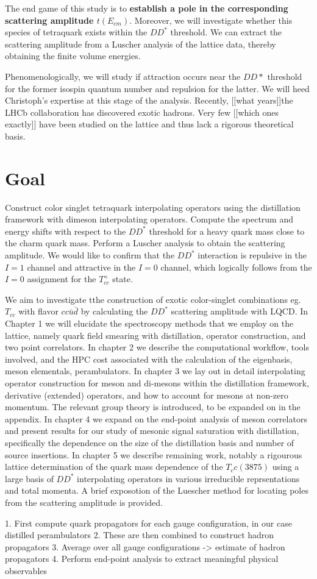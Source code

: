 The end game of this study is to \textbf{establish a pole in the corresponding scattering amplitude $t(E_{cm})$}. Moreover, we will investigate whether this species of tetraquark exists within the $DD^*$ threshold. We can extract the scattering amplitude from a Luscher analysis of the lattice data, thereby obtaining the finite volume energies. 

Phenomenologically, we will study if attraction occurs near the $DD*$ threshold for the former isospin quantum number and repulsion for the latter. We will heed  Christoph's expertise at this stage of the analysis. Recently, [[what years]]the LHCb collaboration has discovered exotic hadrons. Very few [[which ones exactly]] have been studied on the lattice and thus lack a rigorous theoretical basis.
\section{Goal}
Construct color singlet tetraquark interpolating operators using the distillation framework with dimeson interpolating operators. Compute the spectrum and energy shifts with respect to the $DD^*$ threshold for a heavy quark mass close to the charm quark mass. Perform a Luscher analysis to obtain the scattering amplitude. We would like to confirm that the $DD^*$ interaction is repulsive in the $I=1$ channel and attractive in the $I=0$ channel, which logically follows from the $I=0$ assignment for the $T_{cc}^+$ state. 

We aim to investigate tthe construction of exotic color-singlet combinations eg. $T_{cc}$ with flavor $cc\bar{u}\bar{d}$ by calculating the $DD^*$ scattering amplitude with LQCD. In Chapter 1 we will elucidate the spectroscopy methods that we employ on the lattice, namely quark field smearing with distillation, operator construction, and two point correlators. In chapter 2 we describe the computational workflow, tools involved, and the HPC cost associated with the calculation of the eigenbasis, meson elementals, perambulators. In chapter 3 we lay out in detail interpolating operator construction for meson and di-mesons within the distillation framework, derivative (extended) operators, and how to account for mesons at non-zero momentum. The relevant group theory is introduced, to be expanded on in the appendix. In chapter 4 we expand on the end-point analysis of meson correlators and present results for our study of mesonic signal saturation with distillation, specifically the dependence on the size of the distillation basis and number of source insertions. In chapter 5 we describe remaining work, notably a rigourous lattice determination of the quark mass dependence of the $T_cc(3875)$ using a large basis of $DD^*$ interpolating operators in various irreducible reprsentations and total momenta. A brief exposotion of the Luescher method for locating poles from the scattering amplitude is provided. 

1. First compute quark propagators for each gauge configuration, in our case distilled perambulators 
2. These are then combined to construct hadron propagators 
3. Average over all gauge configurations -> estimate of hadron propagators 
4. Perform end-point analysis to extract meaningful physical observables


